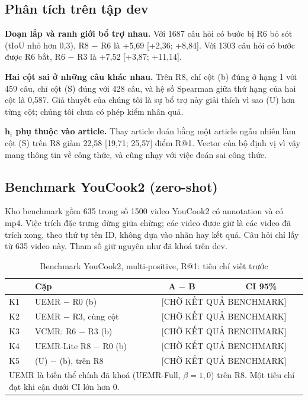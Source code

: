 \documentclass{IEEEtran}
\begin{document}
\subsection{Phân tích trên tập dev}
\textbf{Đoạn lấp và ranh giới bổ trợ nhau.} Với 1687 câu hỏi có bước bị R6 bỏ sót (tIoU nhỏ hơn 0,3), R8 $-$ R6 là +5,69 [+2,36; +8,84]. Với 1303 câu hỏi có bước được R6 bắt, R6 $-$ R3 là +7,52 [+3,87; +11,14].

\textbf{Hai cột sai ở những câu khác nhau.} Trên R8, chỉ cột (b) đúng ở hạng 1 với 459 câu, chỉ cột (S) đúng với 428 câu, và hệ số Spearman giữa thứ hạng của hai cột là 0,587. Giả thuyết của chúng tôi là sự bổ trợ này giải thích vì sao (U) hơn từng cột; chúng tôi chưa có phép kiểm nhân quả.

\textbf{$\mathbf{h}_i$ phụ thuộc vào article.} Thay article đoán bằng một article ngẫu nhiên làm cột (S) trên R8 giảm 22,58 [19,71; 25,57] điểm R@1. Vector của bộ định vị vì vậy mang thông tin về công thức, và cũng nhạy với việc đoán sai công thức.

\subsection{Benchmark YouCook2 (zero-shot)}
Kho benchmark gồm 635 trong số 1500 video YouCook2 có annotation và có mp4. Việc trích đặc trưng dừng giữa chừng; các video được giữ là các video đã trích xong, theo thứ tự tên ID, không dựa vào nhãn hay kết quả. Câu hỏi chỉ lấy từ 635 video này. Tham số giữ nguyên như đã khoá trên dev.

\begin{table}[t]
\caption{Benchmark YouCook2, multi-positive, R@1: tiêu chí viết trước}
\label{tab:bench}
\setlength{\tabcolsep}{3pt}
\centering
\begin{tabular}{|l|p{78pt}|c|c|}
\hline
 & Cặp & A $-$ B & CI 95\% \\
\hline
K1 & UEMR $-$ R0 (b) & \multicolumn{2}{c|}{[CHỜ KẾT QUẢ BENCHMARK]} \\
K2 & UEMR $-$ R3, cùng cột & \multicolumn{2}{c|}{[CHỜ KẾT QUẢ BENCHMARK]} \\
K3 & VCMR: R6 $-$ R3 (b) & \multicolumn{2}{c|}{[CHỜ KẾT QUẢ BENCHMARK]} \\
K4 & UEMR-Lite R8 $-$ R0 (b) & \multicolumn{2}{c|}{[CHỜ KẾT QUẢ BENCHMARK]} \\
K5 & (U) $-$ (b), trên R8 & \multicolumn{2}{c|}{[CHỜ KẾT QUẢ BENCHMARK]} \\
\hline
\multicolumn{4}{p{225pt}}{UEMR là biến thể chính đã khoá (UEMR-Full, $\beta = 1{,}0$) trên R8. Một tiêu chí đạt khi cận dưới CI lớn hơn 0.}
\end{tabular}
\end{table}
\end{document}
